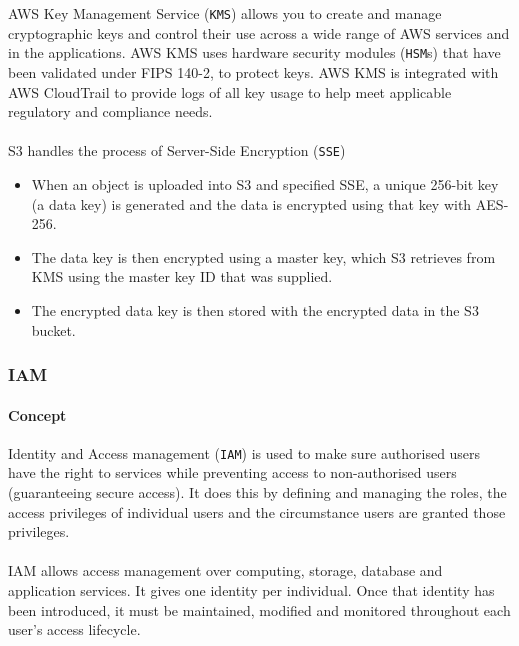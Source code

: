 \documentclass[10pt]{article}
\begin{document}
AWS Key Management Service (\texttt{KMS}) allows you to create and manage cryptographic keys and control their use across a wide range of AWS services and in the applications. AWS KMS uses hardware security modules (\texttt{HSM}s) that have been validated under FIPS 140-2, to protect keys. AWS KMS is integrated with AWS CloudTrail to provide logs of all key usage to help meet applicable regulatory and compliance needs. \cite{aws-kms}
\\ \\
S3 handles the process of Server-Side Encryption (\texttt{SSE}) \cite{encryption-with-aws-kms}
\begin{itemize}
    \item When an object is uploaded into S3 and specified SSE, a unique 256-bit key (a data key) is generated and the data is encrypted using that key with AES-256.
    \item The data key is then encrypted using a master key, which S3 retrieves from KMS using the master key ID that was supplied.
    \item The encrypted data key is then stored with the encrypted data in the S3 bucket.
\end{itemize}

\newpage

\subsubsection{IAM}
\paragraph{Concept}
Identity and Access management (\texttt{IAM}) is used to make sure authorised users have the right to services while preventing access to non-authorised users (guaranteeing secure access). It does this by defining and managing the roles, the access privileges of individual users and the circumstance users are granted those privileges.
\\ \\
IAM allows access management over computing, storage, database and application services. It gives one identity per individual. Once that identity has been introduced, it must be maintained, modified and monitored throughout each user’s access lifecycle. \cite{iam}
\end{document}
